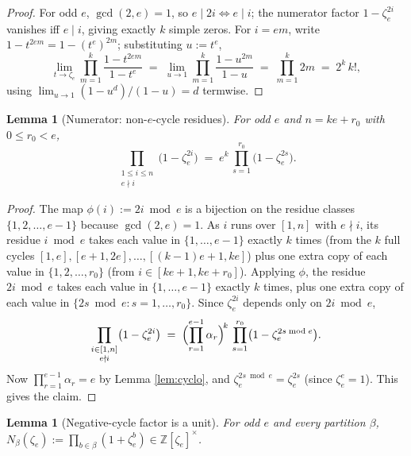 \documentclass[11pt]{article}
\newtheorem{lemma}[theorem]{Lemma}
\theoremstyle{remark}
\newcommand{\zetae}{\zeta_e}
\newcommand{\ZZ}{\mathbb{Z}}
\begin{document}
\begin{proof}
For odd $e$, $\gcd(2, e) = 1$, so $e \mid 2i \iff e \mid i$; the numerator factor $1 - \zetae^{2i}$ vanishes iff $e \mid i$, giving exactly $k$ simple zeros. For $i = e m$, write $1 - t^{2em} = 1 - (t^e)^{2m}$; substituting $u := t^e$,
\[
  \lim_{t \to \zetae}\prod_{m=1}^{k} \frac{1 - t^{2em}}{1 - t^{e}}
  \;=\; \lim_{u \to 1} \prod_{m=1}^{k}\frac{1 - u^{2m}}{1 - u}
  \;=\; \prod_{m=1}^{k} 2m \;=\; 2^{k}\, k!,
\]
using $\lim_{u \to 1}(1 - u^{d})/(1 - u) = d$ termwise.
\end{proof}

\begin{lemma}[Numerator: non-$e$-cycle residues]\label{lem:numerator-nonecycles}
For odd $e$ and $n = ke + r_0$ with $0 \le r_0 < e$,
\[
  \prod_{\substack{1 \le i \le n \\ e \nmid i}}\bigl(1 - \zetae^{2i}\bigr)
  \;=\; e^{k}\, \prod_{s=1}^{r_0}\bigl(1 - \zetae^{2s}\bigr).
\]
\end{lemma}

\begin{proof}
The map $\phi(i) := 2i \bmod e$ is a bijection on the residue classes $\{1, 2, \ldots, e-1\}$ because $\gcd(2, e) = 1$. As $i$ runs over $[1, n]$ with $e \nmid i$, its residue $i \bmod e$ takes each value in $\{1, \ldots, e-1\}$ exactly $k$ times (from the $k$ full cycles $[1, e], [e+1, 2e], \ldots, [(k-1)e+1, ke]$) plus one extra copy of each value in $\{1, 2, \ldots, r_0\}$ (from $i \in [ke+1, ke+r_0]$). Applying $\phi$, the residue $2i \bmod e$ takes each value in $\{1, \ldots, e-1\}$ exactly $k$ times, plus one extra copy of each value in $\{2s \bmod e : s = 1, \ldots, r_0\}$. Since $\zetae^{2i}$ depends only on $2i \bmod e$,
\[
  \prod_{\substack{i \in [1,n] \\ e \nmid i}}\bigl(1 - \zetae^{2i}\bigr)
  \;=\; \Bigl(\prod_{r=1}^{e-1}\alpha_r\Bigr)^{\!k}\, \prod_{s=1}^{r_0}\bigl(1 - \zetae^{2s \bmod e}\bigr).
\]
Now $\prod_{r=1}^{e-1}\alpha_r = e$ by Lemma \ref{lem:cyclo}, and $\zetae^{2s \bmod e} = \zetae^{2s}$ (since $\zetae^e = 1$). This gives the claim.
\end{proof}

\begin{lemma}[Negative-cycle factor is a unit]\label{lem:neg-unit}
For odd $e$ and every partition $\beta$, $N_\beta(\zetae) := \prod_{b \in \beta}(1 + \zetae^b) \in \ZZ[\zetae]^{\times}$.
\end{lemma}
\end{document}
